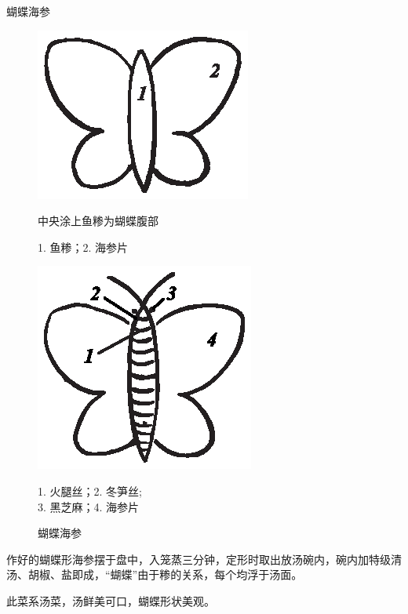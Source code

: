 \begin{recipe}{蝴蝶海参}
\begin{figure}[h]
\vspace{-.25\baselineskip}%
\parbox{14.75em}{%
        \vspace{-.1875\baselineskip}%
        \hspace{2em}\includegraphics[scale=1]{illustration-009.eps}%
        \vspace{-.4375\baselineskip}%
        \caption{中央涂上鱼糁为蝴蝶腹部}
		\label{crushed fish is used to make the body of butterfly}
        \begingroup%
        \small%
        \noindent%
        \null\hspace{4em}1. 鱼糁；2. 海参片
        \endgroup%
}%
\begin{minipage}{10.75em}
        \includegraphics[scale=1]{illustration-010.eps}%
        \caption{蝴蝶海参}
        \label{butterfly sea cucumber}
        \begingroup%
        \small%
        \noindent%
        \null\hspace{1.5em}1. 火腿丝；2. 冬笋丝;\\
        \null\hspace{1.5em}3. 黑芝麻；4. 海参片
        \endgroup%
\end{minipage}
\vspace{-.25\baselineskip}%
\end{figure}%

\step 作好的蝴蝶形海参摆于盘中，入笼蒸三分钟，定形时取出放汤碗内，碗内加特级清
汤、胡椒、盐即成，“蝴蝶”由于糁的关系，每个均浮于汤面。

\features

此菜系汤菜，汤鲜美可口，蝴蝶形状美观。

\end{recipe}

